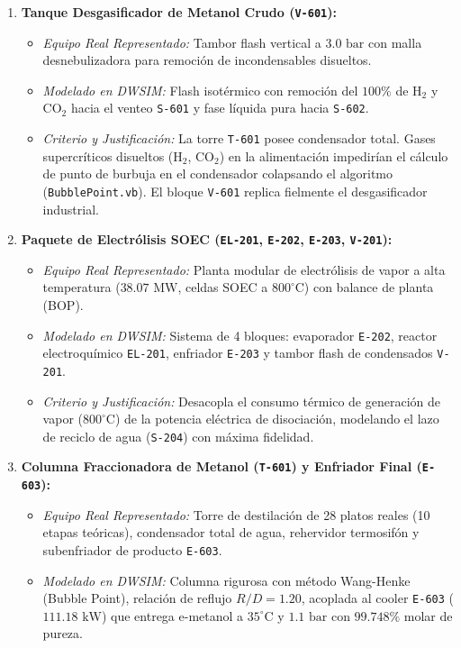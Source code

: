 \documentclass[11pt,letterpaper]{article}
\begin{document}
\begin{enumerate}[leftmargin=1.1em,itemsep=1.0pt,parsep=0pt,topsep=1pt]
    \item \textbf{Tanque Desgasificador de Metanol Crudo (\texttt{V-601}):}
    \begin{itemize}[leftmargin=0.9em,itemsep=0pt,parsep=0pt,topsep=0.5pt]
        \item \textit{Equipo Real Representado:} Tambor flash vertical a $3.0\text{ bar}$ con malla desnebulizadora para remoción de incondensables disueltos.
        \item \textit{Modelado en DWSIM:} Flash isotérmico con remoción del $100\%$ de $\text{H}_2$ y $\text{CO}_2$ hacia el venteo \texttt{S-601} y fase líquida pura hacia \texttt{S-602}.
        \item \textit{Criterio y Justificación:} La torre \texttt{T-601} posee condensador total. Gases supercríticos disueltos ($\text{H}_2$, $\text{CO}_2$) en la alimentación impedirían el cálculo de punto de burbuja en el condensador colapsando el algoritmo (\texttt{BubblePoint.vb}). El bloque \texttt{V-601} replica fielmente el desgasificador industrial.
    \end{itemize}

    \item \textbf{Paquete de Electrólisis SOEC (\texttt{EL-201}, \texttt{E-202}, \texttt{E-203}, \texttt{V-201}):}
    \begin{itemize}[leftmargin=0.9em,itemsep=0pt,parsep=0pt,topsep=0.5pt]
        \item \textit{Equipo Real Representado:} Planta modular de electrólisis de vapor a alta temperatura ($38.07\text{ MW}$, celdas SOEC a $800^\circ\text{C}$) con balance de planta (BOP).
        \item \textit{Modelado en DWSIM:} Sistema de 4 bloques: evaporador \texttt{E-202}, reactor electroquímico \texttt{EL-201}, enfriador \texttt{E-203} y tambor flash de condensados \texttt{V-201}.
        \item \textit{Criterio y Justificación:} Desacopla el consumo térmico de generación de vapor ($800^\circ\text{C}$) de la potencia eléctrica de disociación, modelando el lazo de reciclo de agua (\texttt{S-204}) con máxima fidelidad.
    \end{itemize}

    \item \textbf{Columna Fraccionadora de Metanol (\texttt{T-601}) y Enfriador Final (\texttt{E-603}):}
    \begin{itemize}[leftmargin=0.9em,itemsep=0pt,parsep=0pt,topsep=0.5pt]
        \item \textit{Equipo Real Representado:} Torre de destilación de 28 platos reales (10 etapas teóricas), condensador total de agua, rehervidor termosifón y subenfriador de producto \texttt{E-603}.
        \item \textit{Modelado en DWSIM:} Columna rigurosa con método Wang-Henke (Bubble Point), relación de reflujo $R/D = 1.20$, acoplada al cooler \texttt{E-603} ($111.18\text{ kW}$) que entrega e-metanol a $35^\circ\text{C}$ y $1.1\text{ bar}$ con $99.748\%$ molar de pureza.
    \end{itemize}
\end{enumerate}
\end{document}
